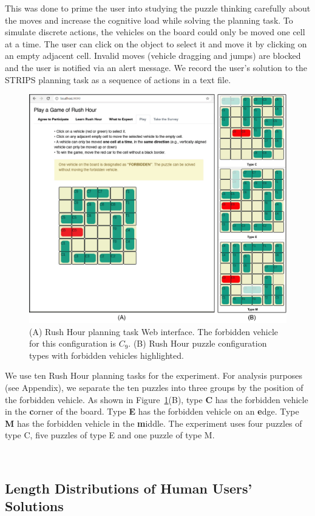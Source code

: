 This was done to prime the user into studying the puzzle thinking carefully about the moves and increase the cognitive load while solving the planning task.
To simulate discrete actions, the vehicles on the board could only be moved one cell at a time. 
The user can click on the object to select it and move it by clicking on an empty adjacent cell. 
Invalid moves (vehicle dragging and jumps) are blocked and the user is notified via an alert message. 
We record the user's solution to the STRIPS planning task as a sequence of actions in a text file.

\begin{figure}[tpb]
  \centering
\includegraphics[width=0.8\columnwidth]{img/figure6.jpg}
  \caption{(A) Rush Hour planning task Web interface. The forbidden vehicle for this configuration is $C_9$. (B) Rush Hour puzzle configuration types with forbidden vehicles highlighted.}
  \label{fig:ui}
\end{figure}

We use ten Rush Hour planning tasks for the experiment. 
For analysis purposes (see Appendix), we separate the ten puzzles into three groups by the position of the forbidden vehicle. 
As shown in Figure~\ref{fig:ui}(B), type \textbf{C} has the forbidden vehicle in the \textbf{c}orner of the board. 
Type \textbf{E} has the forbidden vehicle on an \textbf{e}dge. 
Type \textbf{M} has the forbidden vehicle in the \textbf{m}iddle. The experiment uses four puzzles of type C, five puzzles of type E and one puzzle of type M.

~\subsection{Length Distributions of Human Users' Solutions}
\label{sec:distribution}

